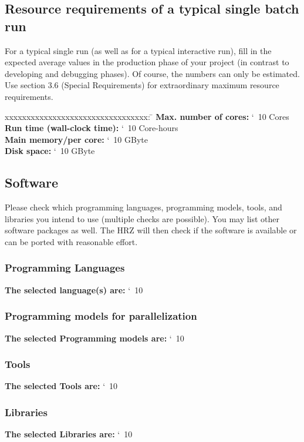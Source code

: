 \documentclass[accentcolor=tud9c,nochapname,11pt]{tudexercise}
\makeatletter
\newcommand\saferead[1]{%
  \bgroup
  \let\do\@makeother
  \dospecials\catcode`\ 10
  \egroup 
}
\makeatother
\begin{document}
\begin{Form}
\subsection{Resource requirements of a typical single batch run}
For a typical single run (as well as for a typical interactive run), fill in the expected average values in the production phase of your project (in contrast to developing and debugging phases). Of course, the numbers can only be estimated. Use section 3.6 (Special Requirements) for extraordinary maximum resource requirements. \\
\begin{tabbing}
xxxxxxxxxxxxxxxxxxxxxxxxxxxxxxxxx:  \= \kill
\textbf{Max. number of cores:} \saferead{req_maxcores.txt} Cores \\
\textbf{Run time (wall-clock time):} \saferead{req_cputime.txt} Core-hours  \\
\textbf{Main memory/per core:} \saferead{req_mmpc.txt} GByte \\
\textbf{Disk space:} \saferead{req_dspace.txt} GByte\\
\end{tabbing}
\subsection{Software}
Please check which programming languages, programming models, tools, and libraries you intend to use (multiple checks are possible). You may list other software packages as well. The HRZ will then check if the software is available or can be ported with reasonable effort. \\
\subsubsection{Programming Languages}
\textbf{The selected language(s) are:} \saferead{proglang.txt} \\
\subsubsection{Programming models for parallelization}
\textbf{The selected Programming models are:} \saferead{progmodels.txt} \\
\subsubsection{Tools}
\textbf{The selected Tools are:} \saferead{tools.txt} \\
\subsubsection{Libraries}
\textbf{The selected Libraries are:} \saferead{libraries.txt}\\

\end{Form}
\end{document}
